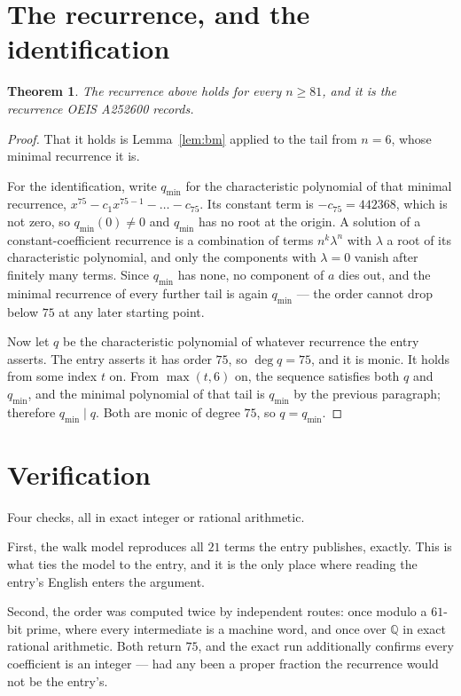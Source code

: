 \documentclass[11pt,a4paper]{article}
\theoremstyle{plain}
\newtheorem{theorem}{Theorem}
\theoremstyle{definition}
\begin{document}
\section{The recurrence, and the identification}

\begin{theorem}
The recurrence above holds for every $n\ge81$, and it is the recurrence OEIS A252600 records.
\end{theorem}

\begin{proof}
That it holds is Lemma~\ref{lem:bm} applied to the tail from $n=6$, whose minimal
recurrence it is.

For the identification, write $q_{\min}$ for the characteristic polynomial of that minimal
recurrence, $x^{75}-c_1x^{75-1}-\dots-c_{75}$. Its constant term is
$-c_{75}=442368$, which is not zero, so $q_{\min}(0)\neq0$ and $q_{\min}$ has no
root at the origin. A solution of a constant-coefficient recurrence is a combination of terms
$n^{k}\lambda^{n}$ with $\lambda$ a root of its characteristic polynomial, and only the
components with $\lambda=0$ vanish after finitely many terms. Since $q_{\min}$ has none, no
component of $a$ dies out, and the minimal recurrence of every further tail is again
$q_{\min}$ --- the order cannot drop below $75$ at any later starting point.

Now let $q$ be the characteristic polynomial of whatever recurrence the entry asserts. The
entry asserts it has order $75$, so $\deg q=75$, and it is monic. It holds from some
index $t$ on. From $\max(t,6)$ on, the sequence satisfies both $q$ and $q_{\min}$, and
the minimal polynomial of that tail is $q_{\min}$ by the previous paragraph; therefore
$q_{\min}\mid q$. Both are monic of degree $75$, so $q=q_{\min}$.
\end{proof}

\section{Verification}

Four checks, all in exact integer or rational arithmetic.

First, the walk model reproduces all $21$ terms the entry publishes, exactly. This is
what ties the model to the entry, and it is the only place where reading the entry's English
enters the argument.

Second, the order was computed twice by independent routes: once modulo a $61$-bit prime, where
every intermediate is a machine word, and once over $\mathbb{Q}$ in exact rational arithmetic.
Both return $75$, and the exact run additionally confirms every coefficient is an integer
--- had any been a proper fraction the recurrence would not be the entry's.
\end{document}
